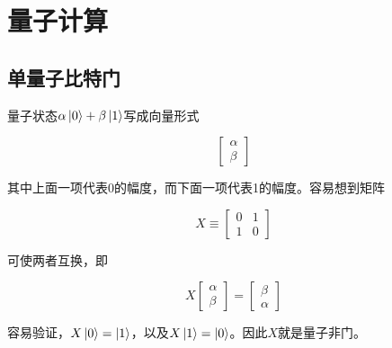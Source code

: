 \section{量子计算}

\subsection{单量子比特门}

量子状态$\alpha\ket{0} + \beta\ket{1}$写成向量形式

\begin{equation}
\begin{bmatrix}
\alpha \\
\beta
\end{bmatrix}
\end{equation}

其中上面一项代表0的幅度，而下面一项代表1的幅度。容易想到矩阵

\begin{equation}
X \equiv
\begin{bmatrix}
0 & 1 \\
1 & 0
\end{bmatrix}
\end{equation}

可使两者互换，即

\begin{equation}
X
\begin{bmatrix}
\alpha \\
\beta
\end{bmatrix}
=
\begin{bmatrix}
\beta \\
\alpha
\end{bmatrix}
\end{equation}

容易验证，$X\ket{0} = \ket{1}$，以及$X\ket{1} = \ket{0}$。因此$X$就是量子非门。

